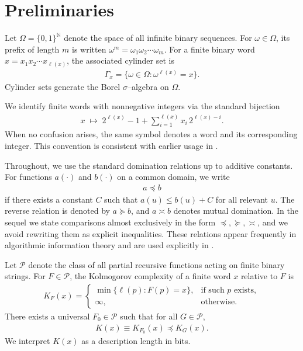 \documentclass[12pt]{article}
\newcommand{\be}{\begin{eqnarray}}
\newcommand{\ee}{\end{eqnarray}}
\newcommand{\dom}{\preceq}
\newcommand{\rdom}{\succeq}
\newcommand{\asym}{\asymp}
\begin{document}
\section{Preliminaries}
\label{sec:preliminaries}


Let $\Omega=\{0,1\}^{\mathbb{N}}$ denote the space of all infinite binary
sequences. For $\omega\in\Omega$, its prefix of length $m$ is written
$\omega^{m}=\omega_1\omega_2\cdots\omega_m$. For a finite binary word
$x=x_1x_2\cdots x_{\ell(x)}$, the associated cylinder set is
\be
\Gamma_x=\{\omega\in\Omega:\omega^{\ell(x)}=x\}.
\label{eq:cylinder_def}
\ee
Cylinder sets generate the Borel $\sigma$--algebra on $\Omega$.

We identify finite words with nonnegative integers via the standard bijection
\be
x \;\mapsto\; 2^{\ell(x)}-1+\sum_{i=1}^{\ell(x)} x_i\,2^{\ell(x)-i}.
\label{eq:word_integer_bijection}
\ee
When no confusion arises, the same symbol denotes a word and its corresponding
integer. This convention is consistent with earlier usage in
\citep{Vidakovic1983Process}.

Throughout, we use the standard domination relations up to additive constants.
For functions $a(\cdot)$ and $b(\cdot)$ on a common domain, we write
\be
a \dom b
\ee
if there exists a constant $C$ such that $a(u)\le b(u)+C$ for all relevant $u$.
The reverse relation is denoted by $a \rdom b$, and $a \asym b$ denotes mutual
domination. In the sequel we state comparisons almost exclusively in the form
$\dom,\rdom,\asym$, and we avoid rewriting them as explicit inequalities.
These relations appear frequently in algorithmic information theory and are used
explicitly in \citep{Vidakovic1983Process, LiVitanyi2008, DowneyHirschfeldt2010, Nies2009}.

\medskip


Let $\mathcal{P}$ denote the class of all partial recursive functions acting on
finite binary strings. For $F\in\mathcal{P}$, the Kolmogorov complexity of a
finite word $x$ relative to $F$ is
\be
K_F(x)=
\left\{
\begin{array}{ll}
\min\{\ell(p):F(p)=x\}, & \text{if such } p \text{ exists},\\
\infty, & \text{otherwise}.
\end{array}
\right.
\label{eq:KF_def}
\ee
There exists a universal $F_0\in\mathcal{P}$ such that for all $G\in\mathcal{P}$,
\be
K(x)\equiv K_{F_0}(x)\dom K_G(x).
\label{eq:universal_K}
\ee
We interpret $K(x)$ as a description length in bits.
\end{document}

